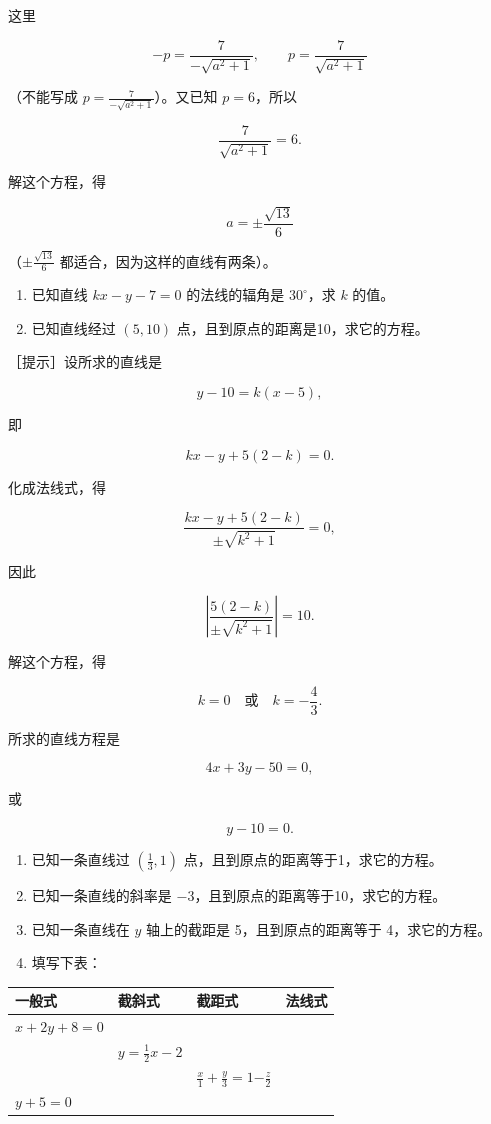 这里

\[
-p=\frac{7}{-\sqrt{a^2+1}},\qquad p=\frac{7}{\sqrt{a^2+1}}
\]

（不能写成 \(p=\frac{7}{-\sqrt{a^2+1}}\)）。又已知 \(p=6\)，所以

\[
\frac{7}{\sqrt{a^2+1}}=6.
\]

解这个方程，得

\[
a=\pm\frac{\sqrt{13}}{6}
\]

（\(\pm\frac{\sqrt{13}}{6}\) 都适合，因为这样的直线有两条）。

\begin{enumerate}
\def\labelenumi{\arabic{enumi}.}
\setcounter{enumi}{2}
\item
  已知直线 \(kx-y-7=0\) 的法线的辐角是 \(30^\circ\)，求 \(k\) 的值。
\item
  已知直线经过 \((5,10)\) 点，且到原点的距离是10，求它的方程。
\end{enumerate}

［提示］设所求的直线是

\[
y-10=k(x-5),
\]

即

\[
kx-y+5(2-k)=0.
\]

化成法线式，得

\[
\frac{kx-y+5(2-k)}{\pm\sqrt{k^2+1}}=0,
\]

因此

\[
\left|\frac{5(2-k)}{\pm\sqrt{k^2+1}}\right|=10.
\]

解这个方程，得

\[
k=0\quad\text{或}\quad k=-\frac{4}{3}.
\]

所求的直线方程是

\[
4x+3y-50=0,
\]

或

\[
y-10=0.
\]

\begin{enumerate}
\def\labelenumi{\arabic{enumi}.}
\setcounter{enumi}{4}
\item
  已知一条直线过 \(\left(\frac{1}{3},1\right)\)
  点，且到原点的距离等于1，求它的方程。
\item
  已知一条直线的斜率是 \(-3\)，且到原点的距离等于10，求它的方程。
\item
  已知一条直线在 \(y\) 轴上的截距是 5，且到原点的距离等于
  4，求它的方程。
\item
  填写下表：
\end{enumerate}

{\def\LTcaptype{none} %
\begin{longtable}[]{@{}llll@{}}
\toprule\noalign{}
一般式 & 截斜式 & 截距式 & 法线式 \\
\midrule\noalign{}
\endhead
\bottomrule\noalign{}
\endlastfoot
\(x+2y+8=0\) & & & \\
& \(y=\frac{1}{2}x-2\) & & \\
& & \(\frac{x}{1}+\frac{y}{3}=1\)\(-\frac{z}{2}\) & \\
\(y+5=0\) & & & \\
\end{longtable}
}

